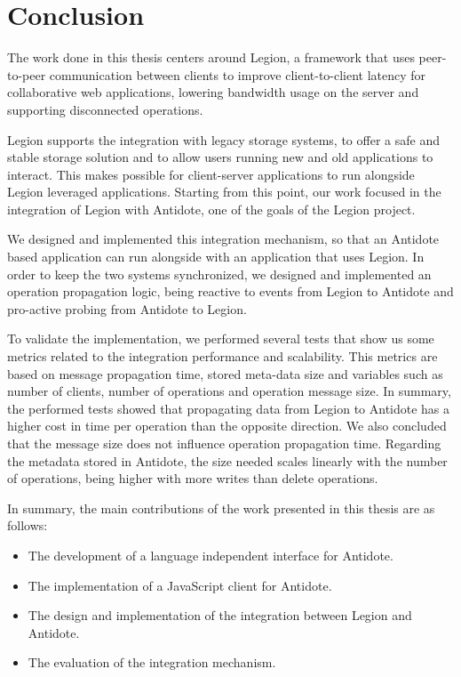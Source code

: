 \chapter{Conclusion}
\label{cha:conclusion}
The work done in this thesis centers around Legion, a framework that uses peer-to-peer communication between clients to improve client-to-client latency for collaborative web applications, lowering bandwidth usage on the server and supporting disconnected operations.\par
	Legion supports the integration with legacy storage systems, to offer a safe and stable storage solution and to allow users running new and old applications to interact. This makes possible for client-server applications to run alongside Legion leveraged applications. Starting from this point, our work focused in the integration of Legion with Antidote, one of the goals of the Legion project.\par
	We designed and implemented this integration mechanism, so that an Antidote based application can run alongside with an application that uses Legion. In order to keep the two systems synchronized, we designed and implemented an operation propagation logic, being reactive to events from Legion to Antidote and pro-active probing from Antidote to Legion.\par
	To validate the implementation, we performed several tests that show us some metrics related to the integration performance and scalability. This metrics are based on message propagation time, stored meta-data size and variables such as number of clients, number of operations and operation message size. In summary, the performed tests showed that propagating data from Legion to Antidote has a higher cost in time per operation than the opposite direction. We also concluded that the message size does not influence operation propagation time. Regarding the metadata stored in Antidote, the size needed scales linearly with the number of operations, being higher with more writes than delete operations.\par
In summary, the main contributions of the work presented in this thesis are as follows:

\begin{itemize}
\item The development of a language independent interface for Antidote.
\item The implementation of a JavaScript client for Antidote.
\item The design and implementation of the integration between Legion and Antidote.
\item The evaluation of the integration mechanism.
\end{itemize}

